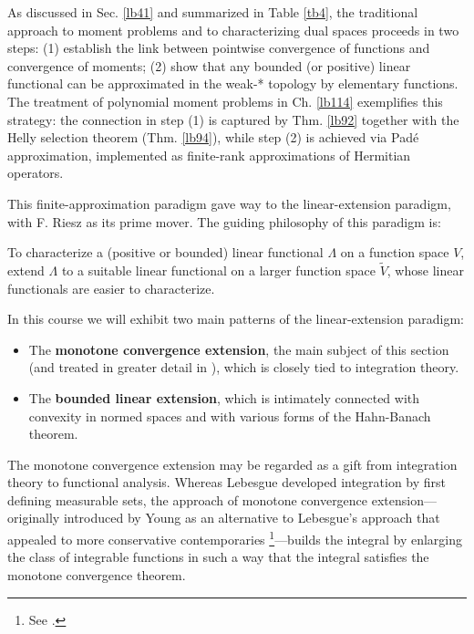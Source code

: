 \documentclass[12pt,b5paper,notitlepage]{article}
\theoremstyle{definition}
\theoremstyle{plain}
\newcommand{\wtd}{\widetilde}
\numberwithin{equation}{section}
\begin{document}
As discussed in Sec. \ref{lb41} and summarized in Table \ref{tb4}, the traditional approach to moment problems and to characterizing dual spaces proceeds in two steps: (1) establish the link between pointwise convergence of functions and convergence of moments; (2) show that any bounded (or positive) linear functional can be approximated in the weak-* topology by elementary functions. The treatment of polynomial moment problems in Ch. \ref{lb114} exemplifies this strategy: the connection in step (1) is captured by Thm. \ref{lb92} together with the Helly selection theorem (Thm. \ref{lb94}), while step (2) is achieved via Pad\'e approximation, implemented as finite-rank approximations of Hermitian operators. 


This finite-approximation paradigm gave way to the linear-extension paradigm, with F. Riesz as its prime mover. The guiding philosophy of this paradigm is:
\begin{tcolorbox}
To characterize a (positive or bounded) linear functional $\Lambda$ on a function space $V$, extend $\Lambda$ to a suitable linear functional on a larger function space $\wtd V$, whose linear functionals are easier to characterize.
\end{tcolorbox}




In this course we will exhibit two main patterns of the linear-extension paradigm:
\begin{itemize}
\item The \textbf{monotone convergence extension}, the main subject of this section (and treated in greater detail in \cite[Ch.  24-25]{Gui-A}), which is closely tied to integration theory.
\item The \textbf{bounded linear extension}, which is intimately connected with convexity in normed spaces and with various forms of the Hahn-Banach theorem.
\end{itemize}
The monotone convergence extension may be regarded as a gift from integration theory to functional analysis. Whereas Lebesgue developed integration by first defining measurable sets, the approach of monotone convergence extension---originally introduced by Young \cite{You10,You13} as an alternative to Lebesgue's approach that appealed to more conservative contemporaries \footnote{See \cite[Sec.~6.6]{Pes}.}---builds the integral by enlarging the class of integrable functions in such a way that the integral satisfies the monotone convergence theorem.
\end{document}
